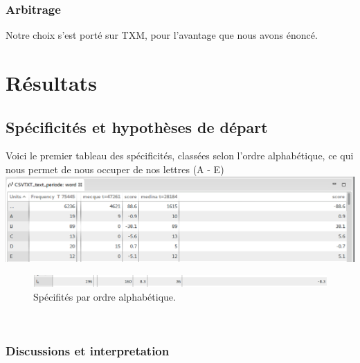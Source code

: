 \documentclass[a4paper,11pt]{report}
\begin{document}
\subsection{Arbitrage}
\label{sec-1-3-3}

Notre choix s'est porté sur TXM, pour l'avantage que nous avons énoncé. \\

\chapter{Résultats}
\label{sec-2}

\section{Spécificités et hypothèses de départ}
\label{sec-2-1}

Voici le premier tableau des spécificités, classées selon l'ordre alphabétique, ce qui nous permet de nous occuper de nos lettres (A - E) \\

\includegraphics[width=.9\linewidth]{./img/specificites_total_1.png} \\
\begin{figure}[htb]
\centering
\includegraphics[width=.9\linewidth]{./img/specificites_total_2.png}
\caption{Spécifités par ordre alphabétique.}
\end{figure} \\


\subsection{Discussions et interpretation}
\label{sec-2-1-1}
\end{document}

